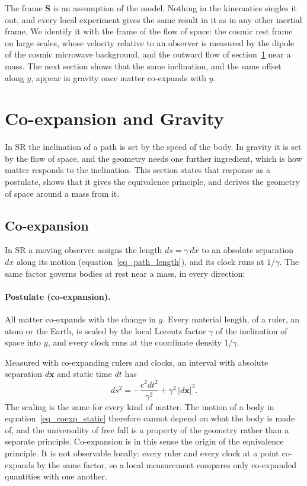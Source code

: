 \documentclass{iopjournal}
\begin{document}
The frame $\mathbf{S}$ is an assumption of the model. Nothing in the kinematics singles it out, and every local experiment gives the same result in it as in any other inertial frame. We identify it with the frame of the flow of space: the cosmic rest frame on large scales, whose velocity relative to an observer is measured by the dipole of the cosmic microwave background, and the outward flow of section~\ref{sec_gravity} near a mass. The next section shows that the same inclination, and the same offset along $y$, appear in gravity once matter co-expands with $y$.

\section{Co-expansion and Gravity}\label{sec_gravity}

In SR the inclination of a path is set by the speed of the body. In gravity it is set by the flow of space, and the geometry needs one further ingredient, which is how matter responds to the inclination. This section states that response as a postulate, shows that it gives the equivalence principle, and derives the geometry of space around a mass from it.

\subsection{Co-expansion}\label{sec_coexp_postulate}

In SR a moving observer assigns the length $ds=\gamma\,dx$ to an absolute separation $dx$ along its motion (equation~\eqref{eq_path_length}), and its clock runs at $1/\gamma$. The same factor governs bodies at rest near a mass, in every direction:

\paragraph{Postulate (co-expansion).} All matter co-expands with the change in $y$. Every material length, of a ruler, an atom or the Earth, is scaled by the local Lorentz factor $\gamma$ of the inclination of space into $y$, and every clock runs at the coordinate density $1/\gamma$.

Measured with co-expanding rulers and clocks, an interval with absolute separation $d\mathbf{x}$ and static time $dt$ has
\begin{equation}\label{eq_coexp_static}
    ds^2=-\frac{c^2dt^2}{\gamma^2}+\gamma^2\,|d\mathbf{x}|^2 .
\end{equation}
The scaling is the same for every kind of matter. The motion of a body in equation~\eqref{eq_coexp_static} therefore cannot depend on what the body is made of, and the universality of free fall is a property of the geometry rather than a separate principle. Co-expansion is in this sense the origin of the equivalence principle. It is not observable locally: every ruler and every clock at a point co-expands by the same factor, so a local measurement compares only co-expanded quantities with one another.
\end{document}
